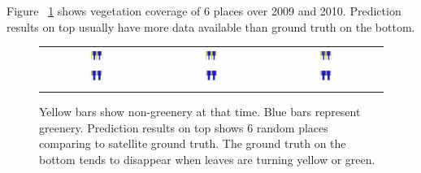 Figure ~\ref{fig:placeinbar} shows vegetation coverage of 6 places over 2009 and 2010. Prediction results on top usually have more data available than ground truth on the bottom.

\begin{figure}
\begin{center}
\begin{tabular}{ccc}
\includegraphics[width=0.14\textwidth]{bar/8560.jpg} &
\includegraphics[width=0.14\textwidth]{bar/8561.jpg} &
\includegraphics[width=0.14\textwidth]{bar/8881.jpg} \\
\includegraphics[width=0.14\textwidth]{bar/8911.jpg} &
\includegraphics[width=0.14\textwidth]{bar/9705.jpg} &
\includegraphics[width=0.14\textwidth]{bar/10816.jpg} \\
\\
\end{tabular}
\end{center}
\vspace{-24pt}
\caption{Yellow bars show non-greenery at that time. Blue bars represent greenery. Prediction results on top shows 6 random places comparing to satellite ground truth. The ground truth on the bottom tends to disappear when leaves are turning yellow or green.}
\label{fig:placeinbar}
\vspace{-12pt}
\end{figure}

